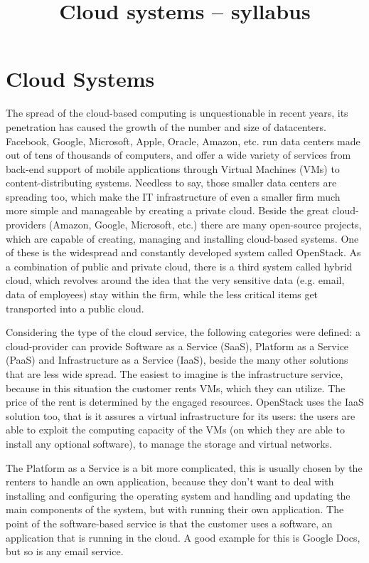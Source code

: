 \documentclass[a4paper]{article}
\title{Cloud systems – syllabus}
\author{}
\date{}
\begin{document}
\maketitle

\tableofcontents

\section{Cloud Systems}

The spread of the cloud-based computing is unquestionable in recent years, its penetration has caused the growth of the
number and size of datacenters. Facebook, Google, Microsoft, Apple, Oracle, Amazon, etc. run data centers made out of
tens of thousands of computers, and offer a wide variety of services from back-end support of mobile applications
through Virtual Machines (VMs) to content-distributing systems. Needless to say, those smaller data centers are spreading
too, which make the IT infrastructure of even a smaller firm much more simple and manageable by creating a private
cloud. Beside the great cloud-providers (Amazon, Google, Microsoft, etc.) there are many open-source projects, which
are capable of creating, managing and installing cloud-based systems. One of these is the widespread and constantly
developed system called OpenStack. As a combination of public and private cloud, there is a third system called hybrid
cloud, which revolves around the idea that the very sensitive data (e.g. email, data of employees) stay within the
firm, while the less critical items get transported into a public cloud.

Considering the type of the cloud service, the following categories were defined: a cloud-provider can provide Software
as a Service (SaaS), Platform as a Service (PaaS) and Infrastructure as a Service (IaaS), beside the many other
solutions that are less wide spread. The easiest to imagine is the infrastructure service, because in this situation
the customer rents VMs, which they can utilize. The price of the rent is determined by the engaged
resources. OpenStack uses the IaaS solution too, that is it assures a virtual infrastructure for its users: the users
are able to exploit the computing capacity of the VMs (on which they are able to install any optional
software), to manage the storage and virtual networks.

The Platform as a Service is a bit more complicated, this is usually chosen by the renters to handle an own
application, because they don't want to deal with installing and configuring the operating system and handling and
updating the main components of the system, but with running their own application. The point of the software-based
service is that the customer uses a software, an application that is running in the cloud. A good example for this is
Google Docs, but so is any email service.
\end{document}
